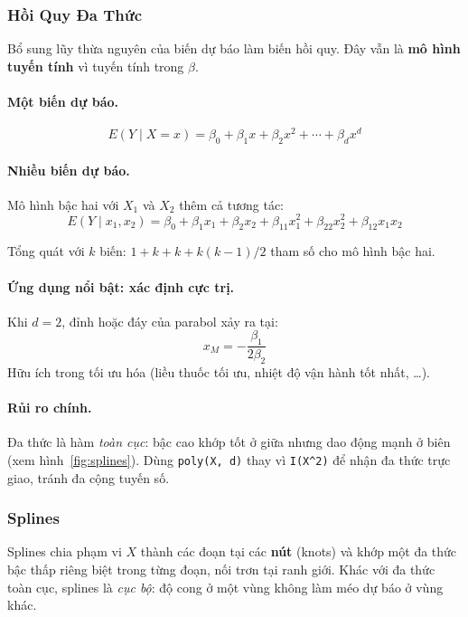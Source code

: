 \documentclass[12pt, a4paper]{article}
\begin{document}
\subsubsection{Hồi Quy Đa Thức}

Bổ sung lũy thừa nguyên của biến dự báo làm biến hồi quy. Đây vẫn là \textbf{mô hình tuyến tính} vì tuyến tính trong $\beta$.

\paragraph{Một biến dự báo.}
\[
  E(Y \mid X = x) = \beta_0 + \beta_1 x + \beta_2 x^2 + \cdots + \beta_d x^d
\]

\paragraph{Nhiều biến dự báo.}
Mô hình bậc hai với $X_1$ và $X_2$ thêm cả tương tác:
\[
  E(Y \mid x_1, x_2) = \beta_0 + \beta_1 x_1 + \beta_2 x_2
                      + \beta_{11} x_1^2 + \beta_{22} x_2^2 + \beta_{12} x_1 x_2
\]

Tổng quát với $k$ biến: $1 + k + k + k(k-1)/2$ tham số cho mô hình bậc hai.

\paragraph{Ứng dụng nổi bật: xác định cực trị.}
Khi $d = 2$, đỉnh hoặc đáy của parabol xảy ra tại:
\[
  x_M = -\frac{\beta_1}{2\beta_2}
\]
Hữu ích trong tối ưu hóa (liều thuốc tối ưu, nhiệt độ vận hành tốt nhất, \ldots).

\paragraph{Rủi ro chính.}
Đa thức là hàm \textit{toàn cục}: bậc cao khớp tốt ở giữa nhưng dao động mạnh ở biên (xem hình~\ref{fig:splines}). Dùng \texttt{poly(X, d)} thay vì \texttt{I(X\^{}2)} để nhận đa thức trực giao, tránh đa cộng tuyến số.

\subsubsection{Splines}

Splines chia phạm vi $X$ thành các đoạn tại các \textbf{nút} (knots) và khớp một đa thức bậc thấp riêng biệt trong từng đoạn, nối trơn tại ranh giới. Khác với đa thức toàn cục, splines là \textit{cục bộ}: độ cong ở một vùng không làm méo dự báo ở vùng khác.
\end{document}
